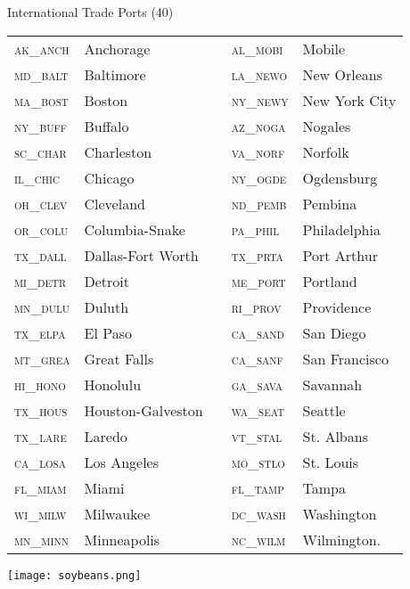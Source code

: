 \documentclass[10pt]{beamer}
\begin{document}
\begin{frame}{International Trade Ports (40) }
\small
\vspace{5pt}
\begin{tabular}{lllll}
\textsc{ak\_anch}&Anchorage&&		\textsc{al\_mobi}&Mobile	     \\
\textsc{md\_balt}&Baltimore&&		\textsc{la\_newo}&New Orleans	     \\
\textsc{ma\_bost}&Boston&&		\textsc{ny\_newy}&New York City	     \\
\textsc{ny\_buff}&Buffalo&&		\textsc{az\_noga}&Nogales	     \\
\textsc{sc\_char}&Charleston&&		\textsc{va\_norf}&Norfolk	     \\
\textsc{il\_chic}&Chicago&&		\textsc{ny\_ogde}&Ogdensburg	     \\
\textsc{oh\_clev}&Cleveland&&		\textsc{nd\_pemb}&Pembina	     \\
\textsc{or\_colu}&Columbia-Snake&&	\textsc{pa\_phil}&Philadelphia	     \\
\textsc{tx\_dall}&Dallas-Fort Worth&&	\textsc{tx\_prta}&Port Arthur	     \\
\textsc{mi\_detr}&Detroit&&		\textsc{me\_port}&Portland	     \\
\textsc{mn\_dulu}&Duluth&&		\textsc{ri\_prov}&Providence	     \\
\textsc{tx\_elpa}&El Paso&&		\textsc{ca\_sand}&San Diego	     \\
\textsc{mt\_grea}&Great Falls&&		\textsc{ca\_sanf}&San Francisco	     \\
\textsc{hi\_hono}&Honolulu&&		\textsc{ga\_sava}&Savannah	     \\
\textsc{tx\_hous}&Houston-Galveston&&	\textsc{wa\_seat}&Seattle	     \\
\textsc{tx\_lare}&Laredo&&		\textsc{vt\_stal}&St. Albans	     \\
\textsc{ca\_losa}&Los Angeles&&		\textsc{mo\_stlo}&St. Louis	     \\
\textsc{fl\_miam}&Miami&&		\textsc{fl\_tamp}&Tampa		     \\
\textsc{wi\_milw}&Milwaukee&&		\textsc{dc\_wash}&Washington		\\
\textsc{mn\_minn}&Minneapolis&&		\textsc{nc\_wilm}&Wilmington.        
\end{tabular}
\vspace{5pt}

\end{frame}


\begin{frame}{}
\texttt{[image: soybeans.png]}
\end{frame}
\end{document}
